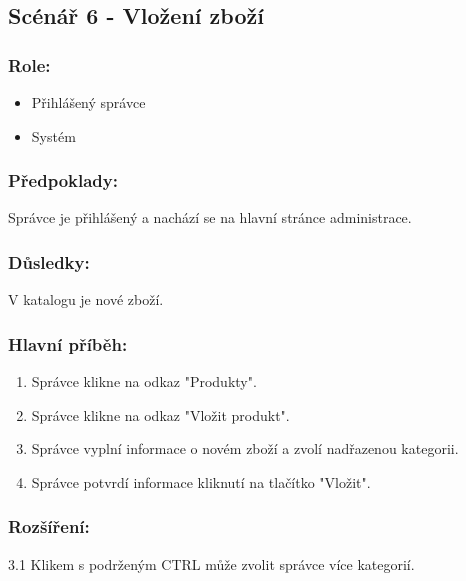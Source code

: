 \documentclass[11pt,twoside,a4paper]{book}
\begin{document}
\subsection{Scénář 6 - Vložení zboží}

\subsubsection*{Role:}

\begin{itemize}
\item Přihlášený správce
\item Systém
\end{itemize}

\subsubsection*{Předpoklady:}

Správce je přihlášený a nachází se na hlavní stránce administrace.

\subsubsection*{Důsledky:}

V katalogu je nové zboží.

\subsubsection*{Hlavní příběh:}

\begin{enumerate}
\item Správce klikne na odkaz "Produkty".
\item Správce klikne na odkaz "Vložit produkt".
\item Správce vyplní informace o novém zboží a zvolí nadřazenou kategorii.
\item Správce potvrdí informace kliknutí na tlačítko "Vložit".
\end{enumerate}

\subsubsection*{Rozšíření:}

\begin{description}
\item  3.1 Klikem s podrženým CTRL může zvolit správce více kategorií.
\end{description}
\end{document}

